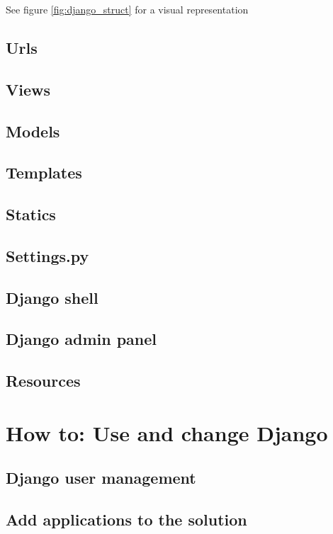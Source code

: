 \documentclass{report}
\begin{document}
See figure \ref{fig:django_struct} for a visual representation

\subsection{Urls} \label{django:urls}

\subsection{Views} \label{django:views}
\subsection{Models} \label{django:models}
\subsection{Templates} \label{django:templates}
\subsection{Statics} \label{django:static}
\subsection{Settings.py} \label{django:settings}
\subsection{Django shell} \label{django:shell}
\subsection{Django admin panel} \label{django:adminpanel}
\subsection{Resources} \label{django:resources}

\section{How to: Use and change Django} \label{sec:use_and_change_django}
\subsection{Django user management} 
\subsection{Add applications to the solution}
\end{document}
